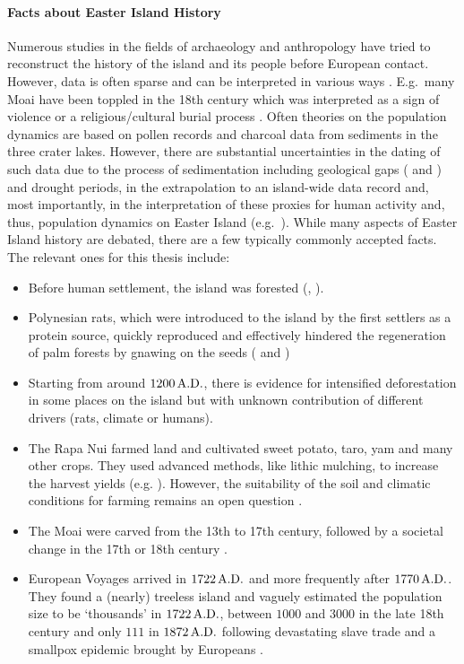 \paragraph{Facts about Easter Island History}
Numerous studies in the fields of archaeology and anthropology have tried to reconstruct the history of the island and its people before European contact.
However, data is often sparse and can be interpreted in various ways \citep{Merico2017}.
E.g.\ many Moai have been toppled in the 18th century which was interpreted as a sign of violence \citep{Bahn2017} or a religious/cultural burial process \citep{Cauwe2011}.
Often theories on the population dynamics are based on pollen records and charcoal data from sediments in the three crater lakes.
However, there are substantial uncertainties in the dating of such data due to the process of sedimentation including geological gaps (\citet{Hunt2007} and \citet{Bahn2017}) and drought periods, in the extrapolation to an island-wide data record \citep{Rull2020} and, most importantly, in the interpretation of these proxies for human activity and, thus, population dynamics on Easter Island (e.g.\  \citep{Cole2008}).
While many aspects of Easter Island history are debated, there are a few typically commonly accepted facts.
The relevant ones for this thesis include:
\begin{itemize}
	\item Before human settlement, the island was forested (\citet{Mieth2015}, \citet{Rull2010}).
	\item Polynesian rats, which were introduced to the island by the first settlers as a protein source, quickly reproduced and effectively hindered the regeneration of palm forests by gnawing on the seeds (\citet{Hunt2007} and \citet{Bahn2017})
	\item Starting from around $1200\,{\rm A.D.}$, there is evidence for intensified deforestation in some places on the island \citep{Rull2020} but with unknown contribution of different drivers (rats, climate or humans).
	\item The Rapa Nui farmed land and cultivated sweet potato, taro, yam and many other crops. They used advanced methods, like lithic mulching, to increase the harvest yields (e.g. \citep{Louwagie2006}). However, the suitability of the soil and climatic conditions for farming remains an open question \citep{Bahn2017}.
	\item The Moai were carved from the 13th to 17th century, followed by a societal change in the 17th or 18th century \citep{Cauwe2011}.
	\item European Voyages arrived in $1722\, {\rm A.D.}$ and more frequently after $1770\, {\rm A.D.}$. They found a (nearly) treeless island and vaguely estimated the population size to be `thousands' in $1722\, {\rm A.D.}$, between $1000$ and $3000$ in the late 18th century and only $111$ in $1872\, {\rm A.D.}$ following devastating slave trade and a smallpox epidemic brought by Europeans \citep{Bahn2017}.
\end{itemize}

